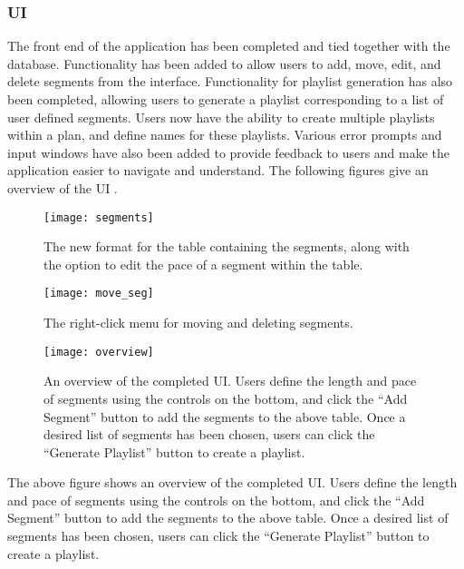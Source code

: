 \documentclass{article}
\begin{document}
\subsubsection{UI}

The front end of the application has been completed and tied together with the database. Functionality has been added to allow users to add, move, edit, and delete segments from the interface. Functionality for playlist generation has also been completed, allowing users to generate a playlist corresponding to a list of user defined segments. Users now have the ability to create multiple playlists within a plan, and define names for these playlists. Various error prompts and input windows have also been added to provide feedback to users and make the application easier to navigate and understand. The following figures give an overview of the UI \cite{PyQT_tut} \cite{PyQT_guide}.

\begin{figure}[h]
\centering
\captionsetup{justification=centering}
\texttt{[image: segments]}
\caption{The new format for the table containing the segments, along with the option to edit the pace of a segment within the table.}
\label{fig:segments}
\end{figure}

\begin{figure}[h]
\centering
\captionsetup{justification=centering}
\texttt{[image: move\_seg]}
\caption{The right-click menu for moving and deleting segments.}
\label{fig:move_seg}
\end{figure}

\begin{figure}[h]
\centering
\captionsetup{justification=centering}
\texttt{[image: overview]}
\caption{An overview of the completed UI. Users define the length and pace of segments using the controls on the bottom, and click the ``Add Segment'' button to add the segments to the above table. Once a desired list of segments has been chosen, users can click the ``Generate Playlist'' button to create a playlist.}
\label{fig:overview}
\end{figure}

The above figure shows an overview of the completed UI. Users define the length and pace of segments using the controls on the bottom, and click the ``Add Segment'' button to add the segments to the above table. Once a desired list of segments has been chosen, users can click the ``Generate Playlist'' button to create a playlist.
\end{document}
